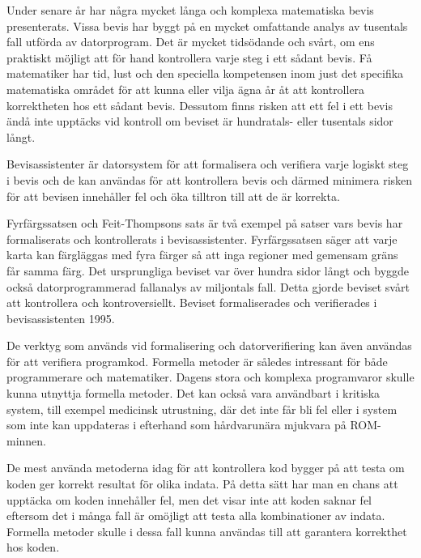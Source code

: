 Under senare år har några mycket långa och komplexa matematiska bevis
presenterats. Vissa bevis har byggt på en mycket omfattande analys av
tusentals fall utförda av datorprogram. Det är mycket tidsödande och svårt, om
ens praktiskt möjligt att för hand kontrollera varje steg i ett sådant bevis. Få
matematiker har tid, lust och den speciella kompetensen inom just det specifika
matematiska området för att kunna eller vilja ägna år åt att
kontrollera korrektheten hos ett sådant bevis. Dessutom finns risken att ett
fel i ett bevis ändå inte upptäcks vid kontroll om beviset är hundratals- eller
tusentals sidor långt\cite{harrison2008formal}.

Bevisassistenter är datorsystem för att formalisera och verifiera varje logiskt
steg i bevis och de kan användas för att kontrollera bevis och därmed minimera
risken för att bevisen innehåller fel och öka tilltron till att de är korrekta.

Fyrfärgssatsen\cite{gonthier2008formal} och Feit-Thompsons
sats\cite{aschbacher2004status} är två exempel på satser vars bevis har
formaliserats och kontrollerats i bevisassistenter. Fyrfärgssatsen säger att
varje karta kan färgläggas med fyra färger så att inga regioner med gemensam
gräns får samma färg. Det ursprungliga beviset var över hundra sidor långt och
byggde också datorprogrammerad fallanalys av miljontals fall. Detta gjorde
beviset svårt att kontrollera och kontroversiellt. Beviset formaliserades och
verifierades i bevisassistenten \coq{} 1995.

De verktyg som används vid formalisering och datorverifiering kan även användas
för att verifiera programkod. Formella metoder är således intressant för både
programmerare och matematiker.
Dagens stora och komplexa programvaror skulle kunna utnyttja formella metoder.
Det kan också vara användbart i kritiska system, till exempel medicinsk
utrustning, där det inte får bli fel eller i system som inte kan uppdateras i
efterhand som hårdvarunära mjukvara på ROM-minnen.

De mest använda metoderna idag för att kontrollera kod bygger på att testa om
koden ger korrekt resultat för olika indata. På detta sätt har man en chans att
upptäcka om koden innehåller fel, men det visar inte att koden saknar fel
eftersom det i många fall är omöjligt att testa alla kombinationer av indata.
Formella metoder skulle i dessa fall kunna användas till att garantera
korrekthet hos koden.

